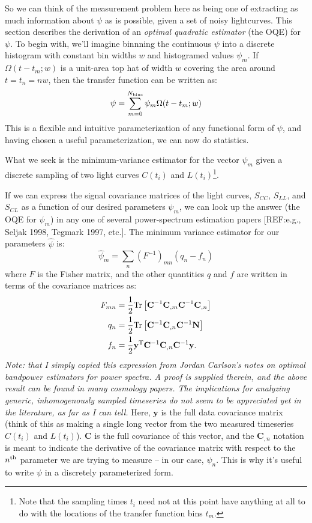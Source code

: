 \documentclass[11pt,a4paper]{article}
\begin{document}
 So we can think of the measurement problem here as being one of
 extracting as much information about $\psi$ as is possible, given a
 set of noisy lightcurves. This section describes the derivation of an
 {\it optimal quadratic estimator} (the OQE) for $\psi$. To begin with, we'll
 imagine binnning the continuous $\psi$ into a discrete histogram with
 constant bin widths $w$ and histogramed values $\psi_m$. If
 $\Omega(t-t_m;w)$ is a unit-area top hat of width $w$ covering the
 area around $t=t_n=nw$, then the transfer function can be written as:
\begin{equation}
  \psi = \sum\limits_{m=0}^{N_{\rm bins}}\psi_m\Omega(t-t_m;w)
\end{equation}
This is a flexible and intuitive parameterization of any functional
form of $\psi$, and having chosen a useful parameterization, we can
now do statistics.

What we seek is the minimum-variance estimator for the vector $\psi_m$
given a discrete sampling of two light curves $C(t_i)$ and
$L(t_i)$\footnote{Note that the sampling times $t_i$ need not at this point
have anything at all to do with the locations of the transfer function
bins $t_m$.}.

If we can express the signal covariance matrices of the light curves,
$S_{CC}$, $S_{LL}$, and $S_{CL}$ as a function of our desired
parameters $\psi_m$, we can look up the answer (the OQE for $\psi_m$)
in any one of several power-spectrum estimation papers [REF:e.g.,
Seljak 1998, Tegmark 1997, etc.]. The minimum variance estimator for
our parameters $\hat{\psi}$ is: \begin{equation}
  \hat{\psi}_m = \sum\limits_{n}\left(F^{-1}\right)_{mn}\left(q_n-f_n\right)
\end{equation}
where $F$ is the Fisher matrix, and the other quantities $q$ and $f$
are written in terms of the covariance matrices as:
\begin{align}
  F_{mn} &=\frac{1}{2}{\rm Tr}\left[\mathbf{C}^{-1}\mathbf{C}_{,m}\mathbf{C}^{-1}\mathbf{C}_{,n}\right] \\
  q_n &=\frac{1}{2}{\rm Tr}\left[\mathbf{C}^{-1}\mathbf{C}_{,n}\mathbf{C}^{-1}\mathbf{N}\right] \\
  f_n &=\frac{1}{2}\mathbf{y}^{\rm T}\mathbf{C}^{-1}\mathbf{C}_{,n}\mathbf{C}^{-1}\mathbf{y}.
\end{align} {\it Note: that I simply copied this expression from
  Jordan Carlson's notes on optimal bandpower estimators for power
  spectra. A proof is supplied therein, and the above result can be
  found in many cosmology papers. The implications for analyzing
  generic, inhomogenously sampled timeseries do not seem to be
  appreciated yet in the literature, as far as I can tell.} Here,
$\mathbf{y}$ is the full data covariance matrix (think of this as
making a single long vector from the two measured timeseries $C(t_i)$
and $L(t_i)$). $\mathbf{C}$ is the full covariance of this vector, and
the $\mathbf{C}_{,n}$ notation is meant to indicate the derivative of
the covariance matrix with respect to the $n^{\rm th}$ parameter we
are trying to measure -- in our case, $\psi_n$. This is why it's
useful to write $\psi$ in a discretely parameterized form.
\end{document}
